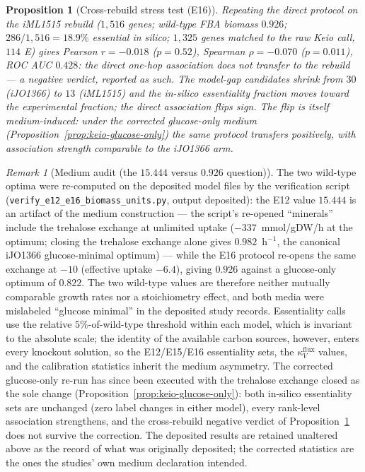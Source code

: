 \documentclass[11pt,a4paper]{article}
\theoremstyle{plain}
\newtheorem{proposition}[theorem]{Proposition}
\theoremstyle{definition}
\theoremstyle{remark}
\newtheorem{remark}[theorem]{Remark}
\begin{document}
\begin{proposition}[Cross-rebuild stress test (E16)]
\label{prop:keio-e16}
Repeating the direct protocol on the iML1515 rebuild ($1{,}516$
genes; wild-type FBA biomass $0.926$; $286/1{,}516=18.9\%$
essential in silico; $1{,}325$ genes matched to the raw Keio call,
$114$ E) gives Pearson $r=-0.018$ ($p=0.52$), Spearman
$\rho=-0.070$ ($p=0.011$), ROC AUC $0.428$: the direct one-hop
association does \emph{not} transfer to the rebuild --- a negative
verdict, reported as such. The model-gap candidates shrink from
$30$ (iJO1366) to $13$ (iML1515) and the in-silico essentiality fraction moves toward the experimental
fraction; the direct association flips sign. The flip is itself
medium-induced: under the corrected glucose-only medium
(Proposition~\ref{prop:keio-glucose-only}) the same protocol
transfers positively, with association strength comparable to the
iJO1366 arm.
\end{proposition}

\begin{remark}[Medium audit (the $15.444$ versus $0.926$ question)]
\label{rem:keio-medium-audit}
The two wild-type optima were re-computed on the deposited model
files by the verification script
(\texttt{verify\_e12\_\allowbreak e16\_\allowbreak biomass\_\allowbreak units.py}, output deposited):
the E12 value $15.444$ is an artifact of the medium
construction --- the script's re-opened ``minerals'' include the
trehalose exchange at unlimited uptake ($-337$~mmol/gDW/h at the
optimum; closing the trehalose exchange alone gives
$0.982$~h$^{-1}$, the canonical iJO1366 glucose-minimal optimum)
--- while the E16
protocol re-opens the same exchange at $-10$ (effective uptake
$-6.4$), giving $0.926$ against a glucose-only optimum of
$0.822$. The two wild-type values are therefore neither mutually
comparable growth rates nor a stoichiometry effect, and both media
were mislabeled ``glucose minimal'' in the deposited study
records. Essentiality calls use the relative $5\%$-of-wild-type
threshold within each model, which is invariant to the absolute
scale; the identity of the available carbon sources, however,
enters every knockout solution, so the E12/E15/E16 essentiality
sets, the $\kappa^{\mathrm{flux}}_V$ values, and the calibration
statistics inherit the medium asymmetry. The corrected glucose-only re-run has since been executed with
the trehalose exchange closed as the sole change
(Proposition~\ref{prop:keio-glucose-only}): both in-silico
essentiality sets are unchanged (zero label changes in either
model), every rank-level association strengthens, and the
cross-rebuild negative verdict of Proposition~\ref{prop:keio-e16}
does not survive the correction. The deposited results are
retained unaltered above as the record of what was originally
deposited; the corrected statistics are the ones the studies' own
medium declaration intended.
\end{remark}
\end{document}
